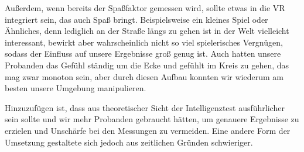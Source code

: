 \documentclass{Bericht}
\begin{document}
\par
Außerdem, wenn bereits der Spaßfaktor gemessen wird, sollte etwas in die VR integriert sein, das auch Spaß bringt. Beispielsweise ein kleines Spiel oder Ähnliches, denn lediglich an der Straße längs zu gehen ist in der Welt vielleicht interessant, bewirkt aber wahrscheinlich nicht so viel spielerisches Vergnügen, sodass der Einfluss auf unsere Ergebnisse groß  genug ist. Auch hatten unsere Probanden das Gefühl ständig um die Ecke und gefühlt im Kreis zu gehen, das mag zwar monoton sein, aber durch diesen Aufbau konnten wir wiederum am besten unsere Umgebung manipulieren.
\par
Hinzuzufügen ist, dass aus theoretischer Sicht der Intelligenztest ausführlicher sein sollte und wir mehr Probanden gebraucht hätten, um genauere Ergebnisse zu erzielen und Unschärfe bei den Messungen zu vermeiden.
Eine andere Form der Umsetzung gestaltete sich jedoch aus zeitlichen Gründen schwieriger.
\end{document}
